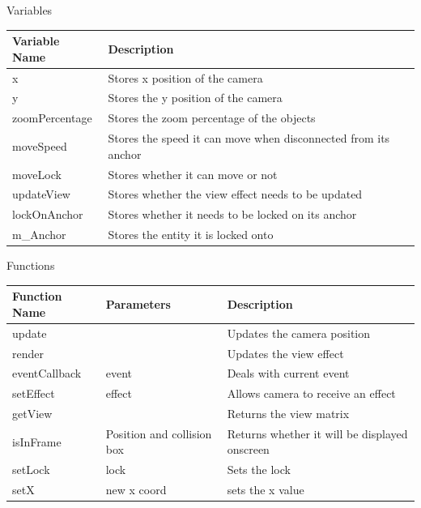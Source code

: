 \documentclass[../Design.tex]{subfiles}
\begin{document}
    \begin{center}
        Variables
        \begin{tabular}{ | m{} | m{} | }
            \hline
            \textbf{Variable Name} & \textbf{Description} \\
            \hline
            x & Stores x position of the camera \\
            \hline
            y & Stores the y position of the camera \\
            \hline
            zoomPercentage & Stores the zoom percentage of the objects \\
            \hline
            moveSpeed & Stores the speed it can move when disconnected from its anchor \\
            \hline
            moveLock & Stores whether it can move or not \\
            \hline
            updateView & Stores whether the view effect needs to be updated \\
            \hline
            lockOnAnchor & Stores whether it needs to be locked on its anchor \\
            \hline
            m\_Anchor & Stores the entity it is locked onto \\
            \hline
        \end{tabular}
        Functions
        \begin{tabular}{ | m{} | m{}| m{} | }
            \hline
            \textbf{Function Name} & \textbf{Parameters} & \textbf{Description} \\
            \hline
            update & & Updates the camera position \\
            \hline
            render & & Updates the view effect \\
            \hline
            eventCallback & event & Deals with current event \\
            \hline
            setEffect & effect & Allows camera to receive an effect \\
            \hline
            getView & & Returns the view matrix \\
            \hline
            isInFrame & Position and collision box & Returns whether it will be displayed onscreen \\
            \hline
            setLock & lock & Sets the lock \\
            \hline
            setX & new x coord & sets the x value \\

\end{tabular}
\end{center}
\end{document}
